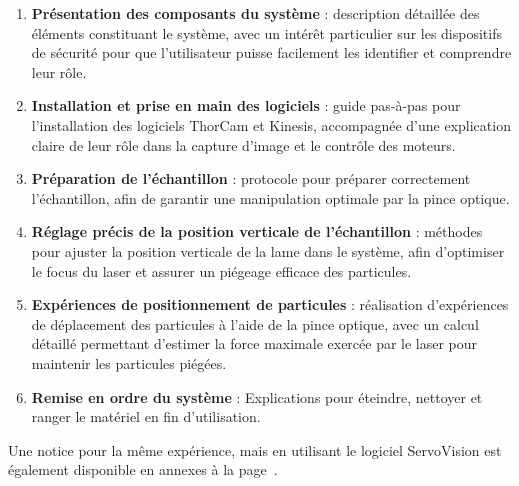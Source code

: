 \begin{enumerate}
    \item \textbf{Présentation des composants du système} : description détaillée des éléments constituant le système, avec un intérêt particulier sur les dispositifs de sécurité pour que l'utilisateur puisse facilement les identifier et comprendre leur rôle.

    \item \textbf{Installation et prise en main des logiciels} : guide pas-à-pas pour l'installation des logiciels ThorCam et Kinesis, accompagnée d'une explication claire de leur rôle dans la capture d'image et le contrôle des moteurs.

    \item \textbf{Préparation de l'échantillon} : protocole pour préparer correctement l'échantillon, afin de garantir une manipulation optimale par la pince optique.

    \item \textbf{Réglage précis de la position verticale de l'échantillon} : méthodes pour ajuster la position verticale de la lame dans le système, afin d'optimiser le focus du laser et assurer un piégeage efficace des particules.

    \item \textbf{Expériences de positionnement de particules} : réalisation d'expériences de déplacement des particules à l'aide de la pince optique, avec un calcul détaillé permettant d'estimer la force maximale exercée par le laser pour maintenir les particules piégées.

    \item \textbf{Remise en ordre du système} : Explications pour éteindre, nettoyer et ranger le matériel en fin d'utilisation.
\end{enumerate}

Une notice pour la même expérience, mais en utilisant le logiciel ServoVision est également disponible en annexes à la page~\pageref{annexe:notice_labo_ServoVision}.